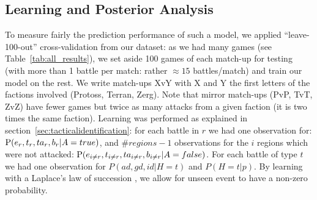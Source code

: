 \subsection{Learning and Posterior Analysis}
To measure fairly the prediction performance of such a model, we applied ``leave-100-out'' cross-validation from our dataset: as we had many games (see Table~\ref{tab:all_results}), we set aside 100 games of each match-up for testing (with more than 1 battle per match: rather $\approx 15$ battles/match) and train our model on the rest. We write match-ups XvY with X and Y the first letters of the factions involved (Protoss, Terran, Zerg). Note that mirror match-ups (PvP, TvT, ZvZ) have fewer games but twice as many attacks from a given faction (it is two times the same faction). Learning was performed as explained in section~\ref{sec:tacticalidentification}: for each battle in $r$ we had one observation for: $\mathrm{P}(e_r,t_r,ta_r,b_r|A=true)$, and $\#regions-1$ observations for the $i$ regions which were not attacked: $\mathrm{P}(e_{i \neq r},t_{i \neq r}, ta_{i \neq r}, b_{i \neq r}|A=false)$. For each battle of type $t$ we had one observation for $P(ad,gd,id|H=t)$ and $P(H=t|p)$. By learning with a Laplace's law of succession \cite{Jaynes}, we allow for unseen event to have a non-zero probability.


